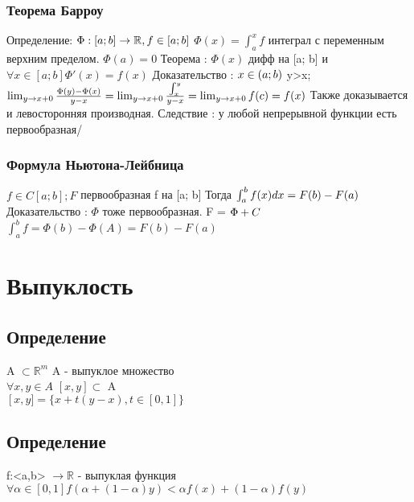 ﻿\documentclass[12pt, a4paper]{article}
\newcommand{\nl}{\newline}
\newcommand{\intba}{\int^b_a}
\begin{document}
        \subsubsection{Теорема Барроу}
        Определение: \nl
        $\Phi : [a;b] \rightarrow \mathbb{R}, f \in [a;b] \nl$
        $\Phi(x) = \int_a^x f$ интеграл с переменным верхним пределом. \nl
        $\Phi(a) = 0$
        Теорема : 
        $\Phi(x)$ дифф на [a; b] и $\forall x \in [a; b] \Phi'(x) = f(x)$ \nl
        Доказательство : \nl
        $x \in (a; b) \nl$
        y>x; $\lim_{y \to x+0} \frac{\Phi(y)-\Phi(x)}{y-x} = \lim_{y \to x+0}\frac{\int^y_x}{y-x} = \lim_{y \to x+0} f(c) = f(x) \nl $
        Также доказывается и левосторонняя производная. \nl
        Следствие : у любой непрерывной функции есть первообразная/
        
        \subsubsection{Формула Ньютона-Лейбница}
        $f \in C[a; b]; F$ первообразная f на [a; b]\nl
        Тогда $\intba f(x)dx = F(b)-F(a) \nl$
        Доказательство : \nl
        $\Phi$ тоже первообразная. F = $\Phi + C\nl$
        $\intba f = \Phi(b)-\Phi(A) = F(b)-F(a)$
        
    

    

\section{Выпуклость}

\subsection{Определение}
    A $\subset \mathbb{R}^m$ A - выпуклое множество \\
    $\forall x, y \in A$  $[x,y] \subset$ A \\
    $\left[x,y]=\lbrace x+t(y-x), t \in [0,1] \rbrace$ \\

\subsection{Определение}
    f:<a,b> $\rightarrow \mathbb{R}$ - выпуклая функция \\
    $\forall \alpha \in [0,1] f (\alpha + (1-\alpha)y)< \alpha f(x) + (1-\alpha)f(y)$ \\
\end{document}
